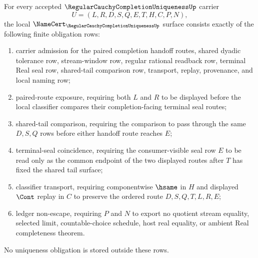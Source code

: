 \begin{theorem}
\label{thm:regular-cauchy-completion-uniqueness-namecert-obligation-surface}
For every accepted $\RegularCauchyCompletionUniquenessUp$ carrier
$$
U=(L,R,D,S,Q,E,T,H,C,P,N),
$$
the local $\NameCert_{\RegularCauchyCompletionUniquenessUp}$ surface consists exactly of the following finite obligation rows:
\begin{enumerate}
\item carrier admission for the paired completion handoff routes, shared dyadic tolerance row, stream-window row, regular rational readback row, terminal Real seal row, shared-tail comparison row, transport, replay, provenance, and local naming row;
\item paired-route exposure, requiring both $L$ and $R$ to be displayed before the local classifier compares their completion-facing terminal seal routes;
\item shared-tail comparison, requiring the comparison to pass through the same $D,S,Q$ rows before either handoff route reaches $E$;
\item terminal-seal coincidence, requiring the consumer-visible seal row $E$ to be read only as the common endpoint of the two displayed routes after $T$ has fixed the shared tail surface;
\item classifier transport, requiring componentwise $\hsame$ in $H$ and displayed $\Cont$ replay in $C$ to preserve the ordered route $D,S,Q,T,L,R,E$;
\item ledger non-escape, requiring $P$ and $N$ to export no quotient stream equality, selected limit, countable-choice schedule, host real equality, or ambient Real completeness theorem.
\end{enumerate}
No uniqueness obligation is stored outside these rows.
\end{theorem}
